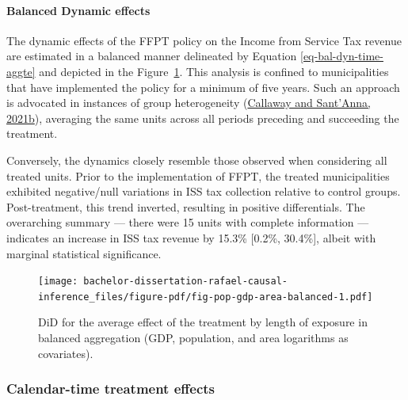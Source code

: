 \documentclass[12pt, a4paper, twoside]{article}
\numberwithin{equation}{subsection} %
\begin{document}
\hypertarget{balanced-dynamic-effects}{%
\paragraph{Balanced Dynamic effects}\label{balanced-dynamic-effects}}

The dynamic effects of the FFPT policy on the Income from Service Tax
revenue are estimated in a balanced manner delineated by Equation
\eqref{eq-bal-dyn-time-aggte} and depicted in the
Figure~\ref{fig-pop-gdp-area-balanced}. This analysis is confined to
municipalities that have implemented the policy for a minimum of five
years. Such an approach is advocated in instances of group heterogeneity
(\protect\hyperlink{ref-did_r}{Callaway and Sant'Anna, 2021b}),
averaging the same units across all periods preceding and succeeding the
treatment.

Conversely, the dynamics closely resemble those observed when
considering all treated units. Prior to the implementation of FFPT, the
treated municipalities exhibited negative/null variations in ISS tax
collection relative to control groups. Post-treatment, this trend
inverted, resulting in positive differentials. The overarching summary
--- there were 15 units with complete information --- indicates an
increase in ISS tax revenue by 15.3\% {[}0.2\%, 30.4\%{]}, albeit with
marginal statistical significance.

\begin{figure}[H]

{\centering \texttt{[image: bachelor-dissertation-rafael-causal-inference\_files/figure-pdf/fig-pop-gdp-area-balanced-1.pdf]}

}

\caption{\label{fig-pop-gdp-area-balanced}DiD for the average effect of
the treatment by length of exposure in balanced aggregation (GDP,
population, and area logarithms as covariates).}

\end{figure}

\begin{table}

\end{table}

\hypertarget{calendar-time-treatment-effects}{%
\subsubsection{Calendar-time treatment
effects}\label{calendar-time-treatment-effects}}
\end{document}
